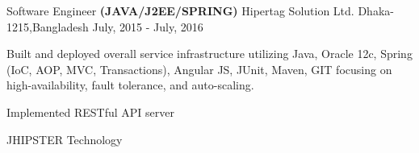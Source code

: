 \begin{cventries}
  \cventry
    {Software Engineer \textbf{(JAVA/J2EE/SPRING)}} %
    {Hipertag Solution Ltd.} %
    {Dhaka-1215,Bangladesh} %
    { July, 2015 - July, 2016} %
    {
      \begin{cvitems}
      	\item {Built and deployed overall service infrastructure utilizing Java, Oracle 12c, Spring (IoC, AOP, MVC, Transactions), Angular JS, JUnit, Maven, GIT focusing on high-availability, fault tolerance, and auto-scaling.}
      	\item {Implemented RESTful API server}
      	\item {JHIPSTER Technology}
      \end{cvitems}
    }
\end{cventries}
